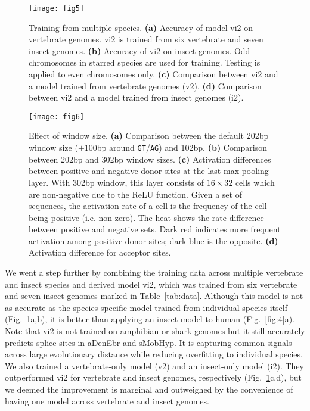 \documentclass[webpdf,contemporary,large,namedate]{oup-authoring-template}%
\begin{document}
\begin{figure}[tb]
\texttt{[image: fig5]}
\caption{Training from multiple species.
{\bf (a)} Accuracy of model vi2 on vertebrate genomes. vi2 is trained from six vertebrate and seven insect genomes.
{\bf (b)} Accuracy of vi2 on insect genomes. Odd chromosomes in starred species are used for training.
Testing is applied to even chromosomes only.
{\bf (c)} Comparison between vi2 and a model trained from vertebrate genomes (v2).
{\bf (d)} Comparison between vi2 and a model trained from insect genomes (i2).}\label{fig:5}
\end{figure}

\begin{figure}[bt]
\texttt{[image: fig6]}
\caption{Effect of window size.
{\bf (a)} Comparison between the default 202bp window size ($\pm$100bp around {\tt GT}/{\tt AG}) and 102bp.
{\bf (b)} Comparison between 202bp and 302bp window sizes.
{\bf (c)} Activation differences between positive and negative donor sites at the last max-pooling layer.
With 302bp window, this layer consists of $16\times32$ cells which are non-negative due to the ReLU function.
Given a set of sequences, the activation rate of a cell is the frequency of the cell being positive (i.e. non-zero).
The heat shows the rate difference between positive and negative sets.
Dark red indicates more frequent activation among positive donor sites; dark blue is the opposite.
{\bf (d)} Activation difference for acceptor sites.}\label{fig:6}
\end{figure}

We went a step further by combining the training data across multiple vertebrate and insect species
and derived model vi2, which was trained from six vertebrate and seven insect genomes marked in Table~\ref{tab:data}.
Although this model is not as accurate as the species-specific model trained from individual species itself (Fig.~\ref{fig:5}a,b),
it is better than applying an insect model to human (Fig.~\ref{fig:4}a).
Note that vi2 is not trained on amphibian or shark genomes but it still accurately predicts splice sites in aDenEbr and sMobHyp.
It is capturing common signals across large evolutionary distance while reducing overfitting to individual species.
We also trained a vertebrate-only model (v2) and an insect-only model (i2).
They outperformed vi2 for vertebrate and insect genomes, respectively (Fig.~\ref{fig:5}c,d),
but we deemed the improvement is marginal and outweighed by the convenience
of having one model across vertebrate and insect genomes.
\end{document}

